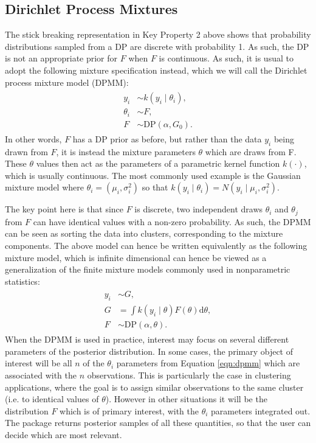\documentclass[nojss]{jss}
\begin{document}
\subsection{Dirichlet Process Mixtures} \label{subsec:dpm}
The stick breaking representation in Key Property 2 above shows that  probability distributions sampled from a DP are discrete with probability 1. As such, the DP is not an appropriate prior for $F$ when $F$ is continuous. As such, it is usual to adopt the following mixture specification instead, which we will call the Dirichlet process mixture model (DPMM):
\begin{align}
\begin{split}
y_i &\sim k(y_i \mid \theta_i), \\
\theta_i &\sim F, \\
F &\sim \text{DP} (\alpha, G_0).
\end{split}
\label{eqn:dpmm}
\end{align}
In other words, $F$ has a DP prior as before, but rather than the data $y_i$ being drawn from $F$, it is instead the mixture parameters $\theta$ which are draws from F.  These $\theta$ values then act as the parameters of a parametric kernel function $k(\cdot)$, which is usually continuous. The most commonly used example is the Gaussian mixture model where $\theta_i = (\mu_i,\sigma^2_i)$ so that $k(y_i \mid \theta_i) = N(y_i \mid \mu_i,\sigma^2_i)$.

The key point here is that since $F$ is discrete, two independent draws $\theta_i$ and $\theta_j$ from $F$  can have identical values with a non-zero probability. As such, the DPMM can be seen as sorting the data into clusters, corresponding to the mixture components. The above model can hence be written equivalently as the following mixture model, which is infinite dimensional can hence be viewed as a generalization of the finite mixture models commonly used in nonparametric statistics:
\begin{align}
\begin{split}
y_i &\sim G, \\
G & = \int k(y_i \mid \theta) F(\theta) \mathrm{d} \theta ,\\
F &\sim \text{DP} (\alpha,\theta).
\end{split}
\label{eqn:dp2}
\end{align}
When the DPMM is used in practice, interest may focus on several different parameters of the posterior distribution. In some cases, the primary object of interest will be all $n$ of the ${\theta_i}$ parameters from Equation \ref{eqn:dpmm} which are associated with the $n$ observations. This is particularly the case in clustering applications, where the goal is to assign similar observations to the same cluster (i.e. to identical values of $\theta$). However in other situations it will be the distribution $F$ which is of primary interest, with the ${\theta_i}$ parameters integrated out. The  package returns posterior samples of all these quantities, so that the user can decide which are most relevant.
\end{document}
